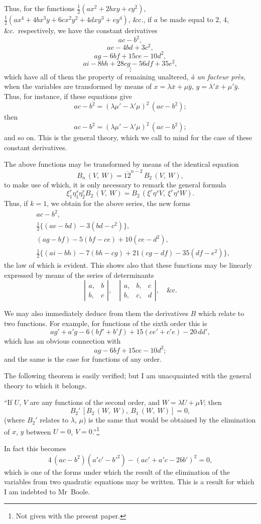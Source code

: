 \documentclass[11pt,a4paper]{article}
\theoremstyle{plain}
\theoremstyle{definition}
\theoremstyle{remark}
\begin{document}
Thus, for the functions $\tfrac{1}{2}(ax^2 + 2bxy + cy^2)$, $\tfrac{1}{2}(ax^4 + 4bx^3y + 6cx^2y^2 + 4dxy^3 + ey^4)$, \&c.,
if $a$ be made equal to $2$, $4$, \&c.\ respectively, we have the constant derivatives
\[
ac - b^2,
\]
\[
ae - 4bd + 3c^2,
\]
\[
ag - 6bf + 15ce - 10d^2,
\]
\[
ai - 8bh + 28cg - 56df + 35e^2,
\]
\[
\vdots
\]
which have all of them the property of remaining unaltered, \textit{\`a un facteur pr\`es}, when
the variables are transformed by means of $x = \lambda\bar{x} + \mu\bar{y}$, $y = \lambda'\bar{x} + \mu'\bar{y}$. Thus, for instance,
if these equations give
\[
ac - b^2 = (\lambda\mu' - \lambda'\mu)^2\,(ac - b^2);
\]
then
\[
ac - b^2 = (\lambda\mu' - \lambda'\mu)^2\,(ac - b^2);
\]
and so on. This is the general theory, which we call to mind for the case of these
constant derivatives.

\newpage

The above functions may be transformed by means of the identical equation
\[
B_n\,(V,\ W) = \overline{12}^{n-2}\,B_2\,(V,\ W),
\]
to make use of which, it is only necessary to remark the general formula
\[
\xi_1^r\eta_1^s\eta_2^r B_2\,(V,\ W) = B_2\,(\xi^r\eta^s V,\ \xi^r\eta^s W).
\]
Thus, if $k=1$, we obtain for the above series, the new forms
\begin{align*}
&ac - b^2, \\
&\tfrac{1}{2}\{(ae - bd) - 3(bd - c^2)\}, \\
&(ag - bf) - 5(bf - ce) + 10(ce - d^2), \\
&\tfrac{1}{2}\{(ai - bh) - 7(bh - cg) + 21(cg - df) - 35(df - e^2)\},
\end{align*}
the law of which is evident. This shows also that these functions may be linearly
expressed by means of the series of determinants
\[
\left|
\begin{array}{cc}
a,&b \\
b,&c
\end{array}
\right|,\quad
\left|
\begin{array}{ccc}
a,&b,&c \\
b,&c,&d
\end{array}
\right|,\quad\&\text{c.}
\]

We may also immediately deduce from them the derivatives $B$ which relate to two
functions. For example, for functions of the sixth order this is
\[
ag' + a'g - 6(bf' + b'f) + 15(ce' + c'e) - 20\,dd',
\]
which has an obvious connection with
\[
ag - 6bf + 15ce - 10d^2;
\]
and the same is the case for functions of any order.

The following theorem is easily verified; but I am unacquainted with the general
theory to which it belongs.

``If $U$, $V$ are any functions of the second order, and $W = \lambda U + \mu V$; then
\[
B_2'\,[B_2\,(W,\ W),\ B_1\,(W,\ W)] = 0,
\]
(where $B_2'$ relates to $\lambda$, $\mu$) is the same that would be obtained by the elimination of
$x$, $y$ between $U=0$, $V=0$.''\footnote{Not given with the present paper.}

In fact this becomes
\[
4\,(ac - b^2)(a'c' - b'^2) - (ac' + a'c - 2bb')^2 = 0,
\]
which is one of the forms under which the result of the elimination of the variables
from two quadratic equations may be written. This is a result for which I am
indebted to Mr~Boole.
\end{document}
